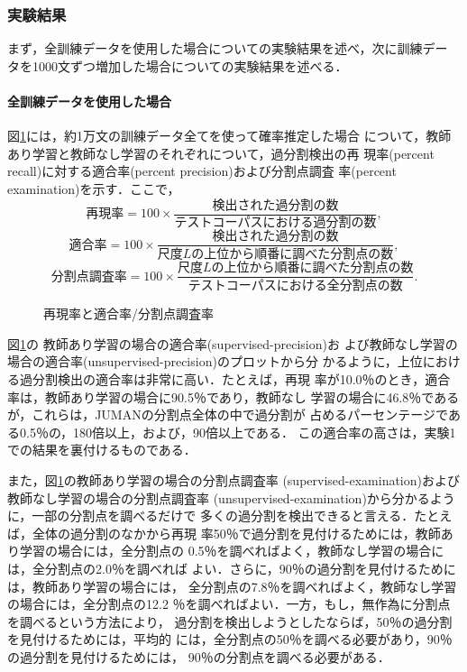 \subsubsection*{実験結果}

まず，全訓練データを使用した場合についての実験結果を述べ，次に訓練デー
タを1000文ずつ増加した場合についての実験結果を述べる．

\paragraph{全訓練データを使用した場合}

図\ref{fig:10000}には，約1万文の訓練データ全てを使って確率推定した場合
について，教師あり学習と教師なし学習のそれぞれについて，過分割検出の再
現率(percent recall)に対する適合率(percent precision)および分割点調査
率(percent examination)を示す．ここで，
\begin{displaymath}
  \label{eq:recall}
  再現率 = 100 \times \frac{検出された過分割の数}{テストコーパスにおける過分割の数},
\end{displaymath}
\begin{displaymath}
  \label{eq:precision}
  適合率 = 100 \times \frac{検出された過分割の数}{尺度Lの上位から順番に調べた分割点の数},
\end{displaymath}
\begin{equation}
  \label{eq:examination}
  分割点調査率 = 100 \times \frac{尺度Lの上位から順番に調べた分割点の数}{テストコーパスにおける全分割点の数}.
\end{equation}

\begin{figure}[htbp]
  \begin{center}
    \caption{再現率と適合率/分割点調査率}
    \label{fig:10000}
  \end{center}
\end{figure}

図\ref{fig:10000}の 教師あり学習の場合の適合率(supervised-precision)お
よび教師なし学習の場合の適合率(unsupervised-precision)のプロットから分
かるように，上位における過分割検出の適合率は非常に高い．たとえば，再現
率が10.0％のとき，適合率は，教師あり学習の場合に90.5％であり，教師なし
学習の場合に46.8％であるが，これらは，JUMANの分割点全体の中で過分割が
占めるパーセンテージである0.5％の，180倍以上，および，90倍以上である．
この適合率の高さは，実験1での結果を裏付けるものである．

また，図\ref{fig:10000}の教師あり学習の場合の分割点調査率
(supervised-examination)および教師なし学習の場合の分割点調査率
(unsupervised-examination)から分かるように，一部の分割点を調べるだけで
多くの過分割を検出できると言える．たとえば，全体の過分割のなかから再現
率50％で過分割を見付けるためには，教師あり学習の場合には，全分割点の
0.5％を調べればよく，教師なし学習の場合には，全分割点の2.0％を調べれば
よい．さらに，90％の過分割を見付けるためには，教師あり学習の場合には，
全分割点の7.8％を調べればよく，教師なし学習の場合には，全分割点の12.2
％を調べればよい．一方，もし，無作為に分割点を調べるという方法により，
過分割を検出しようとしたならば，50％の過分割を見付けるためには，平均的
には，全分割点の50％を調べる必要があり，90％の過分割を見付けるためには，
90％の分割点を調べる必要がある．

